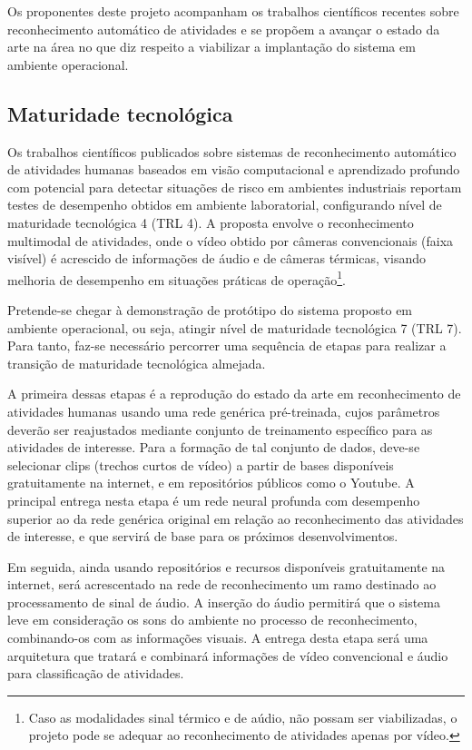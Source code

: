 Os proponentes deste projeto acompanham os trabalhos científicos recentes sobre reconhecimento automático de atividades e se propõem a avançar o estado da arte na área no que diz respeito a viabilizar a implantação do sistema em ambiente operacional.

\subsection{Maturidade tecnológica}
\label{ssec:trl}
Os trabalhos científicos publicados sobre sistemas de reconhecimento automático de atividades humanas baseados em visão computacional e aprendizado profundo com potencial para detectar situações de risco em ambientes industriais reportam testes de desempenho obtidos em ambiente laboratorial, configurando nível de maturidade tecnológica 4 (TRL 4). A proposta envolve o reconhecimento multimodal de atividades, onde o vídeo obtido por câmeras convencionais (faixa visível) é acrescido de informações de áudio e de câmeras térmicas, visando melhoria de desempenho em situações práticas de operação\footnote{Caso as modalidades sinal térmico e de aúdio, não possam ser viabilizadas, o projeto pode se adequar ao reconhecimento de atividades apenas por vídeo.}.

Pretende-se chegar à demonstração de protótipo do sistema proposto em ambiente operacional, ou seja, atingir nível de maturidade tecnológica 7 (TRL 7). Para tanto, faz-se necessário percorrer uma sequência de etapas para realizar a transição de maturidade tecnológica almejada.

A primeira dessas etapas é a reprodução do estado da arte em reconhecimento de atividades humanas usando uma rede genérica pré-treinada, cujos parâmetros deverão ser reajustados mediante conjunto de treinamento específico para as atividades de interesse. Para a formação de tal conjunto de dados, deve-se selecionar clips (trechos curtos de vídeo) a partir de bases disponíveis gratuitamente na internet, e em repositórios públicos como o Youtube. A principal entrega nesta etapa é um rede neural profunda com desempenho superior ao da rede genérica original em relação ao reconhecimento das atividades de interesse, e que servirá de base para os próximos desenvolvimentos.

Em seguida, ainda usando repositórios e recursos disponíveis gratuitamente na internet, será acrescentado na rede de reconhecimento um ramo destinado ao processamento de sinal de áudio. A inserção do áudio permitirá que o sistema leve em consideração os sons do ambiente no processo de reconhecimento, combinando-os com as informações visuais. A entrega desta etapa será uma arquitetura que tratará e combinará informações de vídeo convencional e áudio para classificação de atividades. 

